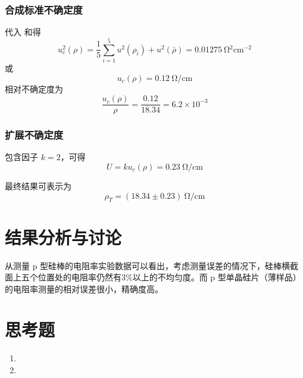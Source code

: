         \subsubsection{合成标准不确定度}
        代入 和得
        \begin{equation}
            u_c^2(\rho)=\frac{1}{5} \sum_{i=1}^{5}u^2(\rho_i) + u^2(\bar{\rho})= 0.01275~\unit{\ohm^2\cm^{-2}}
        \end{equation}
        或
        \begin{equation}
            u_c(\rho)=0.12~\unit{\ohm\per\cm}
        \end{equation}
        相对不确定度为
        \begin{equation}
            \frac{u_c(\rho)}{\rho}=\frac{0.12}{18.34} = 6.2 \times 10^{-3}
        \end{equation}
        \subsubsection{扩展不确定度}
        包含因子 $k = 2$，可得
        \begin{equation}
            U=k u_c(\rho)=0.23~\unit{\ohm\per\cm}
        \end{equation}\par
        最终结果可表示为
        \begin{equation}
            \rho_T = (18.34 \pm 0.23)~\unit{\ohm\per\cm}
        \end{equation}
\section{结果分析与讨论}
    从测量 p 型硅棒的电阻率实验数据可以看出，考虑测量误差的情况下，硅棒横截面上五个位置处的电阻率仍然有3\%以上的不均匀度。而 p 型单晶硅片（薄样品）的电阻率测量的相对误差很小，精确度高。
\section{思考题}
    \begin{enumerate}
        \item {}
        \item {}
    \end{enumerate}
        